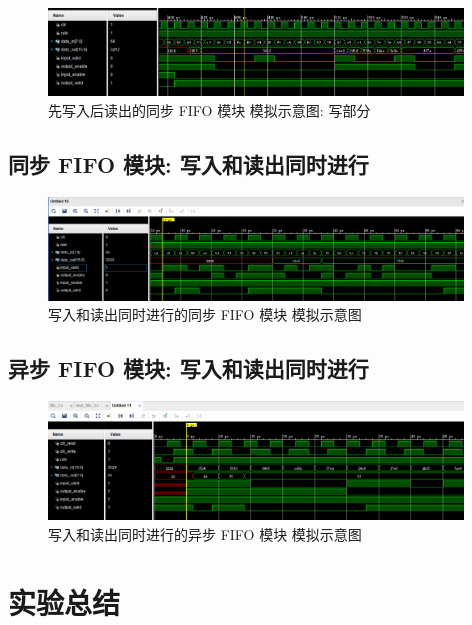 \documentclass{article}
\begin{document}
\begin{figure}[H]
    \centering
    \includegraphics[width=0.98\textwidth]{assets/Fifo-0-2.png}
    \caption{先写入后读出的同步 FIFO 模块 模拟示意图: 写部分}
\end{figure}

\subsection{同步 FIFO 模块: 写入和读出同时进行}

\begin{figure}[H]
    \centering
    \includegraphics[width=0.98\textwidth]{assets/Fifo-1.png}
    \caption{写入和读出同时进行的同步 FIFO 模块 模拟示意图}
\end{figure}

\subsection{异步 FIFO 模块: 写入和读出同时进行}

\begin{figure}[H]
    \centering
    \includegraphics[width=0.98\textwidth]{assets/Fifo-2.png}
    \caption{写入和读出同时进行的异步 FIFO 模块 模拟示意图}
\end{figure}

\section{实验总结}
\end{document}
